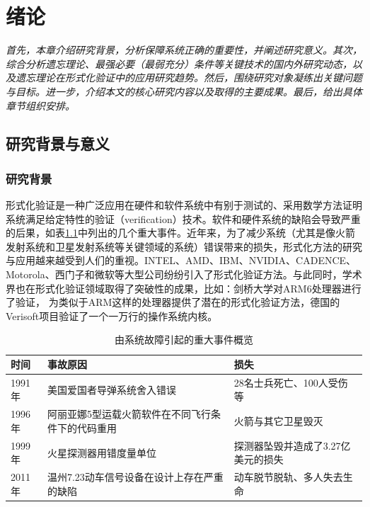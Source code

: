 \chapter{绪论}\label{chapter01}
{\em 首先，本章介绍研究背景，分析保障系统正确的重要性，并阐述研究意义。其次，综合分析遗忘理论、最强必要（最弱充分）条件等关键技术的国内外研究动态，以及遗忘理论在形式化验证中的应用研究趋势。然后，围绕研究对象凝练出关键问题与目标。进一步，介绍本文的核心研究内容以及取得的主要成果。最后，给出具体章节组织安排。}
\section{研究背景与意义}
\subsection{研究背景}

形式化验证是一种广泛应用在硬件\cite{lam2007,lv2000,jani2007Verilog}和软件系统中\cite{yuan2008,gu2005}有别于测试的、采用数学方法证明系统满足给定特性的验证（verification）技术。软件和硬件系统的缺陷会导致严重的后果，如表\ref{tab:systemEvents_1.1}中列出的几个重大事件。近年来，为了减少系统（尤其是像火箭发射系统和卫星发射系统等关键领域的系统）错误带来的损失，形式化方法的研究与应用越来越受到人们的重视。INTEL、AMD、IBM、NVIDIA、CADENCE、 Motorola、西门子和微软等大型公司纷纷引入了形式化验证方法。与此同时，学术界也在形式化验证领域取得了突破性的成果，比如：剑桥大学对ARM6处理器进行了验证\cite{DBLP:conf/tphol/Fox03}， 为类似于ARM这样的处理器提供了潜在的形式化验证方法，德国的Verisoft项目验证了一个一万行的操作系统内核\cite{DBLP:conf/sefm/DaumSS09}。

\begin{table}[htbp]
\caption{由系统故障引起的重大事件概览}
\label{tab:systemEvents_1.1}
\centering
\fontsize{10pt}{\baselineskip}\selectfont
\begin{tabular}{p{}p{}p{}}%
	\toprule
	\textbf{时间}&\textbf{事故原因}&\textbf{损失}\\
	\midrule
    1991年 & 美国爱国者导弹系统舍入错误 & 28名士兵死亡、100人受伤等\\
	1996年 & 阿丽亚娜5型运载火箭软件在不同飞行条件下的代码重用 & 火箭与其它卫星毁灭\\
	1999年 & 火星探测器用错度量单位 & 探测器坠毁并造成了3.27亿美元的损失\\
	2011年 & 温州7.23动车信号设备在设计上存在严重的缺陷 &动车脱节脱轨、多人失去生命\\
	
\bottomrule
\end{tabular}
\end{table}

